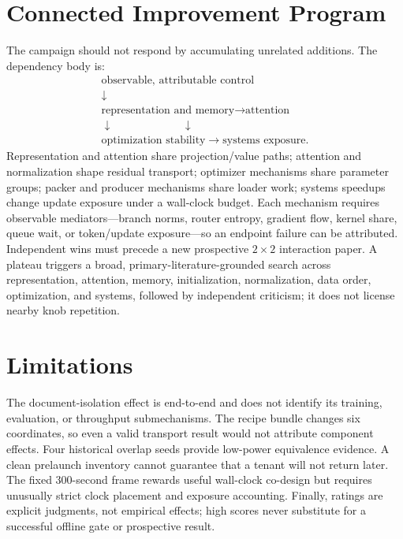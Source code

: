 \documentclass{article}
\begin{document}
\section{Connected Improvement Program}

The campaign should not respond by accumulating unrelated additions.
The dependency body is:
\[
\begin{gathered}
\boxed{\text{observable, attributable control}}\\[-2pt]
\downarrow\\[-2pt]
\boxed{\text{representation and memory}} \rightarrow
\boxed{\text{attention}}\\[-2pt]
\downarrow\hspace{75pt}\downarrow\\[-2pt]
\boxed{\text{optimization stability}} \rightarrow
\boxed{\text{systems exposure}} .
\end{gathered}
\]
Representation and attention share projection/value paths; attention and
normalization shape residual transport; optimizer mechanisms share parameter
groups; packer and producer mechanisms share loader work; systems speedups
change update exposure under a wall-clock budget.  Each mechanism requires
observable mediators---branch norms, router entropy, gradient flow, kernel
share, queue wait, or token/update exposure---so an endpoint failure can be
attributed.  Independent wins must precede a new prospective $2\times2$
interaction paper.  A plateau triggers a broad, primary-literature-grounded
search across representation, attention, memory, initialization,
normalization, data order, optimization, and systems, followed by independent
criticism; it does not license nearby knob repetition.

\section{Limitations}

The document-isolation effect is end-to-end and does not identify its
training, evaluation, or throughput submechanisms.  The recipe bundle changes
six coordinates, so even a valid transport result would not attribute
component effects.  Four historical overlap seeds provide low-power
equivalence evidence.  A clean prelaunch inventory cannot guarantee that a
tenant will not return later.  The fixed 300-second frame rewards useful
wall-clock co-design but requires unusually strict clock placement and
exposure accounting.  Finally, ratings are explicit judgments, not empirical
effects; high scores never substitute for a successful offline gate or
prospective result.
\end{document}
